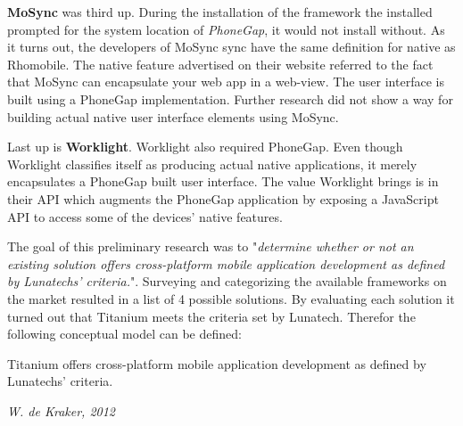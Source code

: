 {\bf MoSync} was third up. During the installation of the framework the installed prompted for the system location of \emph{PhoneGap}, it would not install without. As it turns out, the developers of MoSync sync have the same definition for native as Rhomobile. The native feature advertised on their website referred to the fact that MoSync can encapsulate your web app in a web-view. The user interface is built using a PhoneGap implementation. Further research did not show a way for building actual native user interface elements using MoSync.

Last up is {\bf Worklight}. Worklight also required PhoneGap. Even though Worklight classifies itself as producing actual native applications, it merely encapsulates a PhoneGap built user interface. The value Worklight brings is in their API which augments the PhoneGap application by exposing a JavaScript API to access some of the devices' native features.


The goal of this preliminary research was to "\emph{determine whether or not an existing solution offers cross-platform mobile application development as defined by Lunatechs' criteria.}".  Surveying and categorizing the available frameworks on the market resulted in a list of 4 possible solutions. By evaluating each solution it turned out that Titanium meets the criteria set by Lunatech. Therefor the following conceptual model can be defined:
\begin{shadequote}
Titanium offers cross-platform mobile application development as defined by Lunatechs' criteria.\par\emph{W. de Kraker, 2012}
\end{shadequote}
